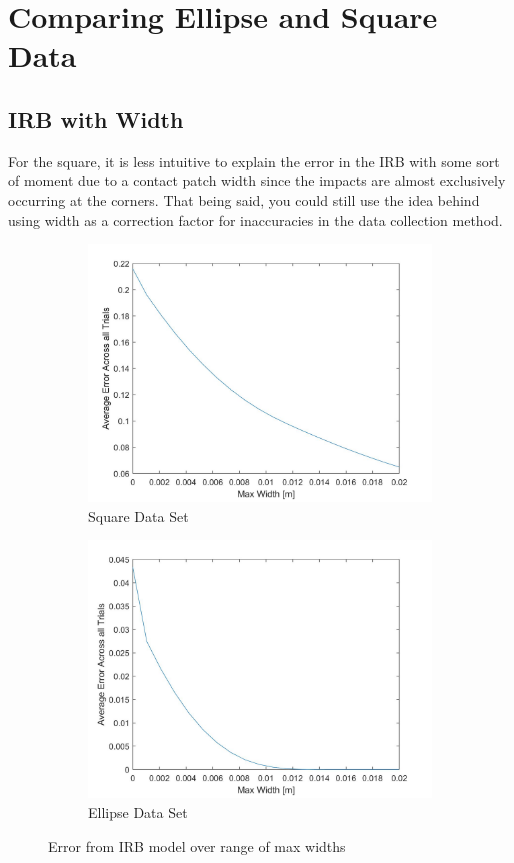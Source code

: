 \documentclass{article}
\begin{document}
\section{Comparing Ellipse  and Square Data}
\subsection{IRB with Width}
For the square, it is less intuitive to explain the error in the IRB with some sort of moment due to a contact patch width since the impacts are almost exclusively occurring at the corners. That being said, you could still use the idea behind using width as a correction factor for inaccuracies in the data collection method. 

\begin{figure}[h!]
    \centering
    \begin{subfigure}[b]{0.45\linewidth}
        \includegraphics[scale=0.125]{squareWidth.jpg}
        \caption{Square Data Set}
        \label{fig:squareWidth}
    \end{subfigure}
    \quad
    \begin{subfigure}[b]{0.45\linewidth}
       \includegraphics[scale=0.125]{ellipseWidth.jpg}
        \caption{Ellipse Data Set}
        \label{fig:ellipseWidth}
    \end{subfigure}
    \caption{Error from IRB model over range of max widths}
\end{figure}
\end{document}
